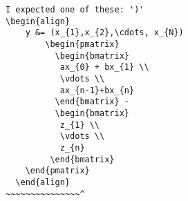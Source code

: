 \begin{verbatim}
I expected one of these: ')'
\begin{align}
    y &= (x_{1},x_{2},\cdots, x_{N})
        \begin{pmatrix}
          \begin{bmatrix}
           ax_{0} + bx_{1} \\           
           \vdots \\
           ax_{n-1}+bx_{n}
          \end{bmatrix} -
          \begin{bmatrix}
           z_{1} \\
           \vdots \\
           z_{n}
         \end{bmatrix}
    \end{pmatrix}
  \end{align}
~~~~~~~~~~~~~~~^
\end{verbatim}
